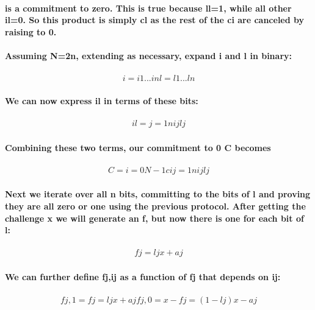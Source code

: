 \documentclass{article}
\begin{document}
\paragraph{is a commitment to zero.  This is true because ll=1, while all other il=0. So this product is simply cl as the rest of the ci are canceled by raising to 0.}

\paragraph{Assuming N=2n, extending as necessary, expand i and l in binary:}

\begin{eqnarray}
  i = i1...in
  l = l1...ln
\end{eqnarray}

\paragraph{We can now express il in terms of these bits:}

\begin{eqnarray}
  il=j=1nijlj
\end{eqnarray}
  
\paragraph{Combining these two terms, our commitment to 0 C becomes}

\begin{eqnarray}
  C=i=0N-1cij=1nijlj
\end{eqnarray}

\paragraph{Next we iterate over all n bits, committing to the bits of l and proving they are all zero or one using the previous protocol.  After getting the challenge x we will generate an f, but now there is one for each bit of l:}

\begin{eqnarray}
  fj=ljx+aj
\end{eqnarray}

\paragraph{We can further define fj,ij as a function of fj that depends on ij:}

\begin{eqnarray}
  fj,1=fj=ljx+aj
  fj,0=x-fj=(1-lj) x -aj
\end{eqnarray}
\end{document}
